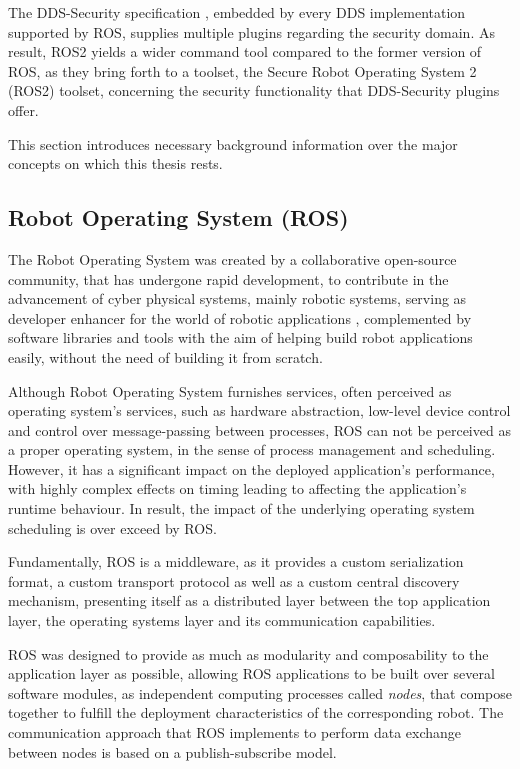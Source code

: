 The DDS-Security specification \cite{ros-dds-integration}, embedded by every DDS implementation supported by ROS, supplies multiple plugins regarding the security domain. As result, ROS2 yields a wider command tool compared to the former version of ROS, as they bring forth to a toolset, the Secure Robot Operating System 2 (ROS2) toolset, concerning the security functionality that DDS-Security plugins offer.

This section introduces necessary background information over the major concepts on which this thesis rests. 


\subsection{Robot Operating System (ROS)}

The Robot Operating System was created by a collaborative open-source community, that has undergone rapid development, to contribute in the advancement of cyber physical systems, mainly robotic systems, serving as developer enhancer for the world of robotic applications \cite{diluoffo2018robot}, complemented by software libraries and tools with the aim of helping build robot applications easily, without the need of building it from scratch.

Although Robot Operating System furnishes services, often perceived as operating system's services, such as hardware abstraction, low-level device control and control over message-passing between processes, ROS can not be perceived as a proper operating system, in the sense of process management and scheduling. However, it has a significant impact on the deployed application's performance, with highly complex effects on timing leading to affecting the application's runtime behaviour. In result, the impact of the underlying operating system scheduling is over exceed by ROS. \cite{intro-ros, casini2019response} 

Fundamentally, ROS is a middleware, as it provides a custom serialization format, a custom transport protocol as well as a custom central discovery mechanism, presenting itself as a distributed layer between the top application layer, the operating systems layer and its communication capabilities. 

ROS was designed to provide as much as modularity and composability to the application layer \cite{casini2019response} as possible, allowing ROS applications to be built over several software modules, as independent computing processes called \textit{nodes}, that compose together to fulfill the deployment characteristics of the corresponding robot. \cite{maruyama2016exploring} The communication approach that ROS implements to perform data exchange between nodes is based on a publish-subscribe model.

